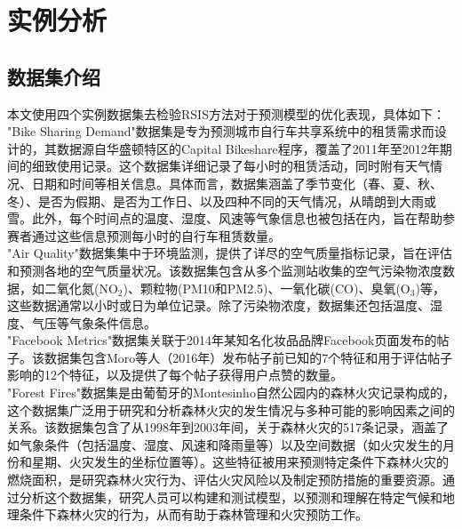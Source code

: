 \documentclass{NauThesis}
\begin{document}
\section{实例分析}
\subsection{数据集介绍}
本文使用四个实例数据集去检验RSIS方法对于预测模型的优化表现\cite{ref83,ref84,ref85,ref86}，具体如下：
\\\hspace*{2em}"Bike Sharing Demand"数据集是专为预测城市自行车共享系统中的租赁需求而设计的，其数据源自华盛顿特区的Capital Bikeshare程序，覆盖了2011年至2012年期间的细致使用记录。这个数据集详细记录了每小时的租赁活动，同时附有天气情况、日期和时间等相关信息。具体而言，数据集涵盖了季节变化（春、夏、秋、冬）、是否为假期、是否为工作日、以及四种不同的天气情况，从晴朗到大雨或雪。此外，每个时间点的温度、湿度、风速等气象信息也被包括在内，旨在帮助参赛者通过这些信息预测每小时的自行车租赁数量。
\\\hspace*{2em}"Air Quality"数据集集中于环境监测，提供了详尽的空气质量指标记录，旨在评估和预测各地的空气质量状况。该数据集包含从多个监测站收集的空气污染物浓度数据，如二氧化氮($\text{NO}_2$)、颗粒物(PM10和PM2.5)、一氧化碳(CO)、臭氧($\text{O}_3$)等，这些数据通常以小时或日为单位记录。除了污染物浓度，数据集还包括温度、湿度、气压等气象条件信息。
\\\hspace*{2em}"Facebook Metrics"数据集关联于2014年某知名化妆品品牌Facebook页面发布的帖子。该数据集包含Moro等人（2016年）发布帖子前已知的7个特征和用于评估帖子影响的12个特征，以及提供了每个帖子获得用户点赞的数量。
\\\hspace*{2em}"Forest Fires"数据集是由葡萄牙的Montesinho自然公园内的森林火灾记录构成的，这个数据集广泛用于研究和分析森林火灾的发生情况与多种可能的影响因素之间的关系。该数据集包含了从1998年到2003年间，关于森林火灾的517条记录，涵盖了如气象条件（包括温度、湿度、风速和降雨量等）以及空间数据（如火灾发生的月份和星期、火灾发生的坐标位置等）。这些特征被用来预测特定条件下森林火灾的燃烧面积，是研究森林火灾行为、评估火灾风险以及制定预防措施的重要资源。通过分析这个数据集，研究人员可以构建和测试模型，以预测和理解在特定气候和地理条件下森林火灾的行为，从而有助于森林管理和火灾预防工作。
\end{document}
